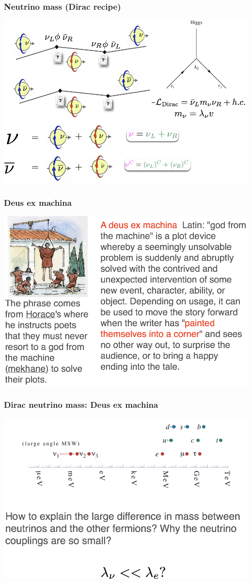 \begin{frame}
\frametitle{Neutrino mass (Dirac recipe)}
\includegraphics[scale=0.30]{img/NeutrinoMassDirac.png}
\end{frame}

\begin{frame}
\frametitle{Deus ex machina}
\includegraphics[scale=0.30]{img/DeusExMachina.png}
\end{frame}

\begin{frame}
\frametitle{Dirac neutrino mass: Deus ex machina}
\includegraphics[scale=0.30]{img/SmallNeutrinoMasses.png}
\end{frame}

